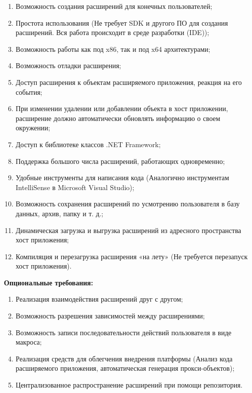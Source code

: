 \label{sec:requirements}
\begin{enumerate}
	\item Возможность создания расширений для конечных пользователей;
	\item Простота использования (Не требует SDK и другого ПО для создания расширений. Вся работа происходит в среде разработки (IDE));
	\item Возможность работы как под x86, так и под x64 архитектурами;
	\item Возможность отладки расширения;
	\item Доступ расширения к объектам расширяемого приложения, реакция на его события;
	\item При изменении удалении или добавлении объекта в хост приложении, расширение должно автоматически обновлять информацию о своем окружении;
	\item Доступ к библиотеке классов .NET Framework;
	\item Поддержка большого числа расширений, работающих одновременно;
	\item Удобные инструменты для написания кода (Аналогично инструментам IntelliSense в Microsoft Visual Studio);
	\item Возможность сохранения расширений по усмотрению пользователя в базу данных, архив, папку и т. д.;
	\item Динамическая загрузка и выгрузка расширений из адресного пространства хост приложения;
	\item Компиляция и перезагрузка расширения «на лету» (Не требуется перезапуск хост приложения).
\end{enumerate}

{\bf Опциональные требования:}
\label{sec:opt_requirements}
\begin{enumerate}
	\item Реализация взаимодействия расширений друг с другом;
	\item Возможность разрешения зависимостей между расширениями;
	\item Возможность записи последовательности действий пользователя в виде макроса;
	\item Реализация средств для облегчения внедрения платформы (Анализ кода расширяемого приложения, автоматическая генерация прокси-объектов);
	\item Централизованное распространение расширений при помощи репозитория.
\end{enumerate}

\pagebreak